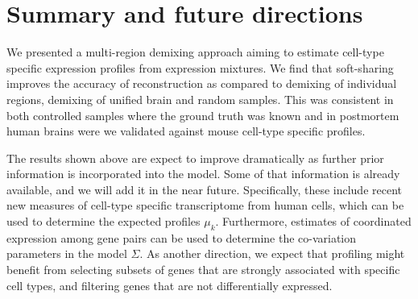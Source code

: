 \documentclass{article} %
\begin{document}
\section{Summary and future directions}

We presented a multi-region demixing approach aiming to estimate cell-type specific expression profiles from expression mixtures. We find that soft-sharing improves the accuracy of reconstruction as compared to demixing of individual regions, demixing of unified brain and random samples. This was consistent in both controlled samples where the ground truth was known and in postmortem human brains were we validated against mouse cell-type specific profiles.

The results shown above are expect to improve dramatically as further prior information is incorporated into the model. Some of that information is already available, and we will add it in the near future.  Specifically, these include recent new measures of cell-type specific transcriptome from human cells, which can be used to determine the expected profiles $\mu_k$. Furthermore, estimates of coordinated expression among gene pairs can be used to determine the co-variation parameters in the model $\Sigma$. 
As another direction, we expect that profiling might benefit from selecting subsets of genes that are strongly associated with specific cell types, and filtering genes that are not differentially expressed.




\end{document}
